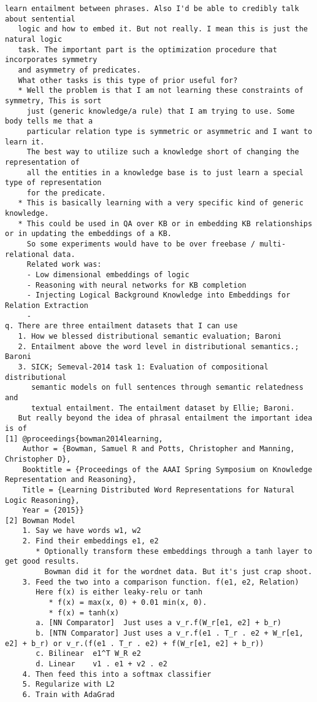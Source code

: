 \documentclass[12pt]{exam} %
\begin{document}
{\begin{Verbatim}[fontsize=\small]
   learn entailment between phrases. Also I'd be able to credibly talk about sentential
   logic and how to embed it. But not really. I mean this is just the natural logic
   task. The important part is the optimization procedure that incorporates symmetry
   and asymmetry of predicates.
   What other tasks is this type of prior useful for?
   * Well the problem is that I am not learning these constraints of symmetry, This is sort
     just (generic knowledge/a rule) that I am trying to use. Some body tells me that a
     particular relation type is symmetric or asymmetric and I want to learn it.
     The best way to utilize such a knowledge short of changing the representation of
     all the entities in a knowledge base is to just learn a special type of representation
     for the predicate.
   * This is basically learning with a very specific kind of generic knowledge.
   * This could be used in QA over KB or in embedding KB relationships or in updating the embeddings of a KB.
     So some experiments would have to be over freebase / multi-relational data.
     Related work was:
     - Low dimensional embeddings of logic
     - Reasoning with neural networks for KB completion
     - Injecting Logical Background Knowledge into Embeddings for Relation Extraction
     -
q. There are three entailment datasets that I can use
   1. How we blessed distributional semantic evaluation; Baroni
   2. Entailment above the word level in distributional semantics.; Baroni
   3. SICK; Semeval-2014 task 1: Evaluation of compositional distributional
      semantic models on full sentences through semantic relatedness and
      textual entailment. The entailment dataset by Ellie; Baroni.
   But really beyond the idea of phrasal entailment the important idea is of
[1] @proceedings{bowman2014learning,
    Author = {Bowman, Samuel R and Potts, Christopher and Manning, Christopher D},
    Booktitle = {Proceedings of the AAAI Spring Symposium on Knowledge Representation and Reasoning},
    Title = {Learning Distributed Word Representations for Natural Logic Reasoning},
    Year = {2015}}
[2] Bowman Model
    1. Say we have words w1, w2
    2. Find their embeddings e1, e2
       * Optionally transform these embeddings through a tanh layer to get good results.
         Bowman did it for the wordnet data. But it's just crap shoot.
    3. Feed the two into a comparison function. f(e1, e2, Relation)
       Here f(x) is either leaky-relu or tanh
          * f(x) = max(x, 0) + 0.01 min(x, 0).
          * f(x) = tanh(x)
       a. [NN Comparator]  Just uses a v_r.f(W_r[e1, e2] + b_r)
       b. [NTN Comparator] Just uses a v_r.f(e1 . T_r . e2 + W_r[e1, e2] + b_r) or v_r.(f(e1 . T_r . e2) + f(W_r[e1, e2] + b_r))
       c. Bilinear  e1^T W_R e2
       d. Linear    v1 . e1 + v2 . e2
    4. Then feed this into a softmax classifier
    5. Regularize with L2
    6. Train with AdaGrad
\end{Verbatim}
}
\newpage
\printglossaries



\end{document}
